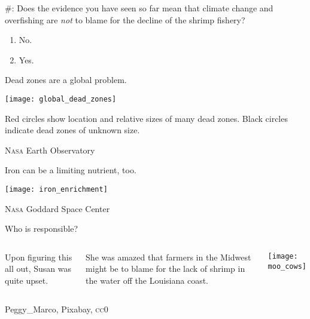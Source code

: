 \documentclass[t]{beamer}
\newcommand*{\cq}[1]{%
	\#{\lining#1}:%
}
\begin{document}
\begin{frame}{\cq{7} Does the evidence you have seen so far mean that climate change and overfishing are \emph{not} to blame for the decline of the shrimp fishery?}
	
	\begin{enumerate}
		\item No.
		
		\item Yes.
		
	\end{enumerate}
\end{frame}
%
\begin{frame}{Dead zones are a global problem.}

	\texttt{[image: global\_dead\_zones]}
	
	Red circles show location and relative sizes of many dead zones. Black circles indicate dead zones of unknown size.
	
	\vfilll
	
	\hfill \tiny \textsc{Nasa} Earth Observatory
	
\end{frame}
%
\begin{frame}{Iron can be a limiting nutrient, too.}

	\texttt{[image: iron\_enrichment]}
		
	\vfilll
	
	\hfill \tiny \textsc{Nasa} Goddard Space Center
\end{frame}
%
\begin{frame}{Who is responsible?}

	\begin{columns}[t]
	
	
			Upon figuring this all out, Susan was quite upset.  \bigskip

			She was amazed that farmers in the Midwest might 
			be to blame for the lack of shrimp in the water off the 
			Louisiana coast. 
	

			\texttt{[image: moo\_cows]}
				
	\end{columns}

	\vfilll
	
	\hfill \tiny Peggy\_Marco, Pixabay, \textsc{cc0}
	
\end{frame}
%
\end{document}
